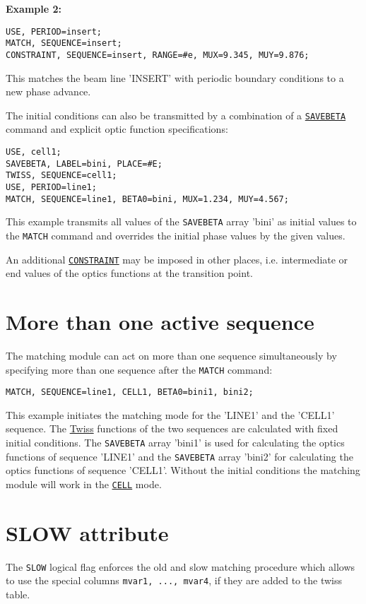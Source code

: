 {\bf Example 2:}	
\begin{verbatim}
USE, PERIOD=insert;
MATCH, SEQUENCE=insert;
CONSTRAINT, SEQUENCE=insert, RANGE=#e, MUX=9.345, MUY=9.876;
\end{verbatim}
This matches the beam line 'INSERT' with periodic boundary conditions to
a new phase advance. 

The initial conditions can also be transmitted by a combination of a
\hyperref[sec:savebeta]{\tt SAVEBETA} command and explicit
optic function specifications: 
\begin{verbatim}
USE, cell1;
SAVEBETA, LABEL=bini, PLACE=#E;
TWISS, SEQUENCE=cell1;
USE, PERIOD=line1;
MATCH, SEQUENCE=line1, BETA0=bini, MUX=1.234, MUY=4.567;
\end{verbatim}

This example transmits all values of the {\tt SAVEBETA} array 'bini' as
initial values to the {\tt MATCH} command and overrides the initial phase
values by the given values.

An additional \hyperref[sec:constraint]{\tt CONSTRAINT} may be
imposed in other places, i.e. intermediate or end values of the optics
functions at the transition point.  
 
\section{More than one active sequence}

The matching module can act on more than one sequence simultaneously by
specifying more than one sequence after the {\tt MATCH} command: 
\begin{verbatim}
MATCH, SEQUENCE=line1, CELL1, BETA0=bini1, bini2;
\end{verbatim}
This example initiates the matching mode for the 'LINE1' and the 'CELL1'
sequence. The \hyperref[chap:twiss]{Twiss} functions of the
two sequences are calculated with fixed initial conditions. 
The {\tt SAVEBETA}
array 'bini1' is used for calculating the optics functions of sequence
'LINE1' and the {\tt SAVEBETA} array 'bini2' for calculating the optics
functions of sequence 'CELL1'. Without the initial conditions the
matching module will work in the \hyperref[sec:cell]{\tt CELL}
mode. 
 
\section{SLOW attribute}

The {\tt SLOW} logical flag enforces the old and slow matching procedure
which allows to use the special columns {\tt mvar1, ..., mvar4}, if they
are added to the twiss table.

